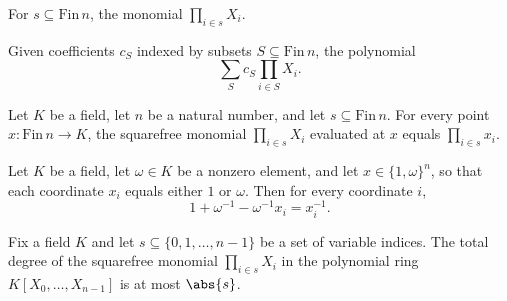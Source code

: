 \begin{definition}
\label{RazborovSmolensky.squarefreeMonomial}
\leanok
For $s \subseteq \mathrm{Fin}\,n$, the monomial $\prod_{i \in s} X_i$.
\end{definition}

\begin{definition}
\label{RazborovSmolensky.squarefreePolynomial}
\leanok
{}
Given coefficients $c_S$ indexed by subsets $S \subseteq \mathrm{Fin}\,n$, the polynomial
\[
  \sum_{S} c_S \prod_{i \in S} X_i .
\]
\end{definition}

\begin{theorem}
\label{RazborovSmolensky.squarefreeMonomial_eval}
\leanok
{}
Let $K$ be a field, let $n$ be a natural number, and let $s \subseteq \mathrm{Fin}\,n$.
For every point $x : \mathrm{Fin}\,n \to K$, the squarefree monomial $\prod_{i \in s}
X_i$ evaluated at $x$ equals $\prod_{i \in s} x_i$.
\end{theorem}

\begin{theorem}
\label{RazborovSmolensky.rootCube_affine_inverse}
\leanok
{}
Let $K$ be a field, let $\omega \in K$ be a nonzero element, and let $x \in
\{1,\omega\}^n$, so that each coordinate $x_i$ equals either $1$ or $\omega$. Then for
every coordinate $i$,
\[
  1 + \omega^{-1} - \omega^{-1} x_i = x_i^{-1}.
\]
\end{theorem}

\begin{theorem}
\label{RazborovSmolensky.squarefreeMonomial_totalDegree_le_card}
\leanok
{}
Fix a field $K$ and let $s \subseteq \{0,1,\dots,n-1\}$ be a set of variable indices.
The total degree of the squarefree monomial $\prod_{i \in s} X_i$ in the polynomial ring
$K[X_0,\dots,X_{n-1}]$ is at most $\abs{s}$.
\end{theorem}

